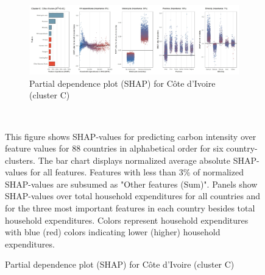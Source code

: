 \begin{figure}[ht!]
    \\
    \vspace{0.5cm}
   \begin{subfigure}[b]{\textwidth}    
   \centering
         \caption{Partial dependence plot (SHAP) for Côte d'Ivoire (cluster C)}
         \label{fig:5b_CIV}
         \includegraphics[width=\textwidth]{Figure 5b/Figure_5b_CIV}    
   \end{subfigure}
    \\
    \vspace{0.5cm}
   
    \begin{subcaption2}
     This figure shows SHAP-values for predicting carbon intensity over feature values for 88 countries in alphabetical order for six country-clusters. The bar chart displays normalized average absolute SHAP-values for all features. Features with less than 3\% of normalized SHAP-values are subsumed as "Other features (Sum)". Panels show SHAP-values over total household expenditures for all countries and for the three most important features in each country besides total household expenditures. Colors represent household expenditures with blue (red) colors indicating lower (higher) household expenditures.
     \end{subcaption2}
\end{figure}

